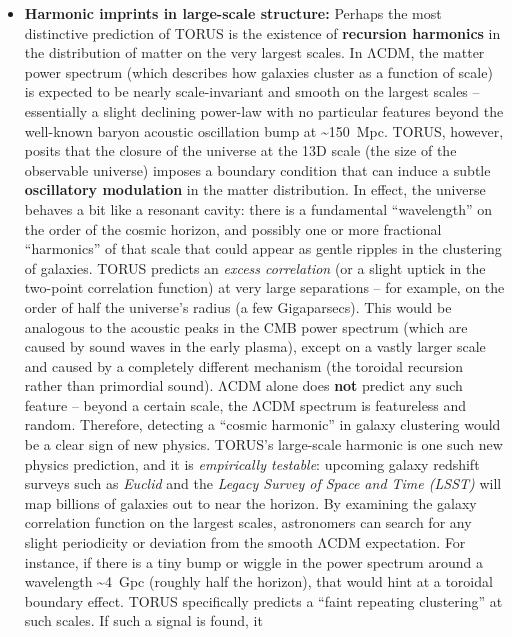 \documentclass[]{article}
\begin{document}
\begin{itemize}
\item
  \textbf{Harmonic imprints in large-scale structure:} Perhaps the most
  distinctive prediction of TORUS is the existence of \textbf{recursion
  harmonics} in the distribution of matter on the very largest scales.
  In ΛCDM, the matter power spectrum (which describes how galaxies
  cluster as a function of scale) is expected to be nearly
  scale-invariant and smooth on the largest scales -- essentially a
  slight declining power-law with no particular features beyond the
  well-known baryon acoustic oscillation bump at
  \textasciitilde{}150~Mpc. TORUS, however, posits that the closure of
  the universe at the 13D scale (the size of the observable universe)
  imposes a boundary condition that can induce a subtle
  \textbf{oscillatory modulation} in the matter distribution​. In
  effect, the universe behaves a bit like a resonant cavity: there is a
  fundamental ``wavelength'' on the order of the cosmic horizon, and
  possibly one or more fractional ``harmonics'' of that scale that could
  appear as gentle ripples in the clustering of galaxies. TORUS predicts
  an \emph{excess correlation} (or a slight uptick in the two-point
  correlation function) at very large separations -- for example, on the
  order of half the universe's radius (a few Gigaparsecs)​. This would
  be analogous to the acoustic peaks in the CMB power spectrum (which
  are caused by sound waves in the early plasma), except on a vastly
  larger scale and caused by a completely different mechanism (the
  toroidal recursion rather than primordial sound). ΛCDM alone does
  \textbf{not} predict any such feature -- beyond a certain scale, the
  ΛCDM spectrum is featureless and random. Therefore, detecting a
  ``cosmic harmonic'' in galaxy clustering would be a clear sign of new
  physics. TORUS's large-scale harmonic is one such new physics
  prediction, and it is \emph{empirically testable}: upcoming galaxy
  redshift surveys such as \emph{Euclid} and the \emph{Legacy Survey of
  Space and Time (LSST)} will map billions of galaxies out to near the
  horizon. By examining the galaxy correlation function on the largest
  scales, astronomers can search for any slight periodicity or deviation
  from the smooth ΛCDM expectation​. For instance, if there is a tiny
  bump or wiggle in the power spectrum around a wavelength
  \textasciitilde{}4~Gpc (roughly half the horizon), that would hint at
  a toroidal boundary effect​. TORUS specifically predicts a ``faint
  repeating clustering'' at such scales​. If such a signal is found, it

\end{itemize}
\end{document}
